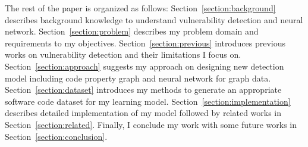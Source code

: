 The rest of the paper is organized as follows:
Section~\ref{section:background} describes background knowledge to understand vulnerability detection and neural network.
Section~\ref{section:problem} describes my problem domain and requirements to my objectives.
Section~\ref{section:previous} introduces previous works on vulnerability detection and their limitations I focus on.
Section~\ref{section:approach} suggests my approach on designing new detection model including code property graph and neural network for graph data.
Section~\ref{section:dataset} introduces my methods to generate an appropriate software code dataset for my learning model.
Section~\ref{section:implementation} describes detailed implementation of my model followed by related works in Section~\ref{section:related}.
Finally, I conclude my work with some future works in Section~\ref{section:conclusion}.